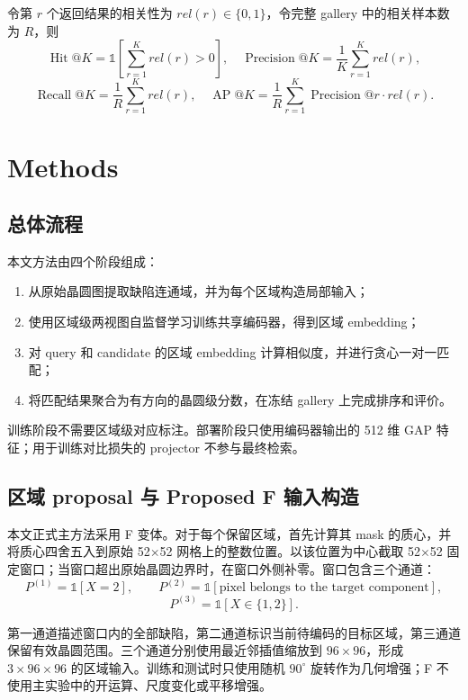 \documentclass[UTF8,a4paper,11pt,fontset=fandol]{ctexart}
\begin{document}
令第 \(r\) 个返回结果的相关性为 \(rel(r)\in\{0,1\}\)，令完整 gallery 中的相关样本数为 \(R\)，则
\[
\operatorname{Hit}@K=\mathbb{1}\left[\sum_{r=1}^{K}rel(r)>0\right],
\quad
\operatorname{Precision}@K=\frac{1}{K}\sum_{r=1}^{K}rel(r),
\]
\[
\operatorname{Recall}@K=\frac{1}{R}\sum_{r=1}^{K}rel(r),
\quad
\operatorname{AP}@K=\frac{1}{R}\sum_{r=1}^{K}
\operatorname{Precision}@r\cdot rel(r).
\]

\section{Methods}

\subsection{总体流程}

本文方法由四个阶段组成：
\begin{enumerate}[label=(\arabic*)]
    \item 从原始晶圆图提取缺陷连通域，并为每个区域构造局部输入；
    \item 使用区域级两视图自监督学习训练共享编码器，得到区域 embedding；
    \item 对 query 和 candidate 的区域 embedding 计算相似度，并进行贪心一对一匹配；
    \item 将匹配结果聚合为有方向的晶圆级分数，在冻结 gallery 上完成排序和评价。
\end{enumerate}

训练阶段不需要区域级对应标注。部署阶段只使用编码器输出的 512 维 GAP 特征；用于训练对比损失的 projector 不参与最终检索。

\subsection{区域 proposal 与 Proposed F 输入构造}

本文正式主方法采用 F 变体。对于每个保留区域，首先计算其 mask 的质心，并将质心四舍五入到原始 52\(\times\)52 网格上的整数位置。以该位置为中心截取 52\(\times\)52 固定窗口；当窗口超出原始晶圆边界时，在窗口外侧补零。窗口包含三个通道：
\[
P^{(1)}=\mathbb{1}[X=2],\qquad
P^{(2)}=\mathbb{1}[\text{pixel belongs to the target component}],
\]
\[
P^{(3)}=\mathbb{1}[X\in\{1,2\}].
\]

第一通道描述窗口内的全部缺陷，第二通道标识当前待编码的目标区域，第三通道保留有效晶圆范围。三个通道分别使用最近邻插值缩放到 \(96\times96\)，形成 \(3\times96\times96\) 的区域输入。训练和测试时只使用随机 \(90^{\circ}\) 旋转作为几何增强；F 不使用主实验中的开运算、尺度变化或平移增强。
\end{document}
